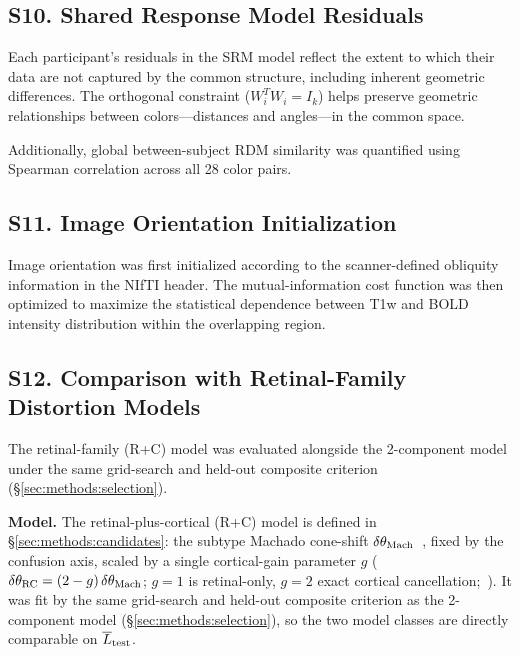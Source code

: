 \subsection*{\textbf{S10. Shared Response Model Residuals}}

Each participant's residuals in the SRM model reflect the extent to which their data are not captured by the common structure, including inherent geometric differences.
The orthogonal constraint ($W_i^T W_i = I_k$) helps preserve geometric relationships between colors---distances and angles---in the common space.

Additionally, global between-subject RDM similarity was quantified using Spearman correlation across all 28 color pairs.



\subsection*{\textbf{S11. Image Orientation Initialization}}

Image orientation was first initialized according to the scanner-defined obliquity information in the NIfTI header.
The mutual-information cost function was then optimized to maximize the statistical dependence between T1w and BOLD intensity distribution within the overlapping region.



\subsection*{\textbf{S12. Comparison with Retinal-Family Distortion Models}}
\label{app:retinal_family}

The retinal-family (R+C) model was evaluated alongside the 2-component model under the same grid-search and held-out composite criterion (\S\ref{sec:methods:selection}).

\textbf{Model.} The retinal-plus-cortical (R+C) model is defined in \S\ref{sec:methods:candidates}: the subtype Machado cone-shift $\delta\theta_{\rm Mach}$~, fixed by the confusion axis, scaled by a single cortical-gain parameter $g$ ($\delta\theta_{\rm RC} = (2-g)\,\delta\theta_{\rm Mach}$; $g = 1$ is retinal-only, $g = 2$ exact cortical cancellation;~). It was fit by the same grid-search and held-out composite criterion as the 2-component model (\S\ref{sec:methods:selection}), so the two model classes are directly comparable on $\overline{L}_{\rm test}$.

